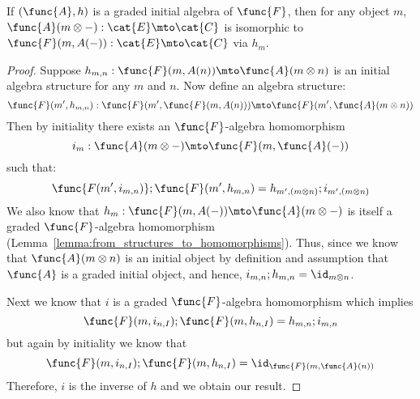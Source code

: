     \begin{lemma}
    \label{lemma:graded_lambeks_lemma}
    If $(\func{A},h)$ is a graded initial algebra of $\func{F}$, 
    then for any object $m$, 
    $\func{A}(m \otimes -) : \cat{E} \mto \cat{C}$ is isomorphic to 
    $\func{F}(m, A(-)) : \cat{E} \mto \cat{C}$ via $h_m$.
    \end{lemma}
    \begin{proof}
    Suppose $h_{m,n} : \func{F}(m,A(n)) \mto \func{A}(m \otimes n)$ is an initial
    algebra structure for any $m$ and $n$.  
    Now define an algebra structure:
    \[
    \func{F}(m',h_{m,n}) : \func{F}(m',\func{F}(m,A(n))) \mto \func{F}(m',\func{A}(m \otimes n))
    \]
    Then by initiality there exists an $\func{F}$-algebra homomorphism 
    $$i_{m} : \func{A}(m \otimes -) \mto \func{F}(m,\func{A}(-))$$ such that:
    $$\func{F(m',i_{m,n})} ; \func{F}(m',h_{m,n}) = h_{m',(m \otimes n)} ;
    i_{m',(m \otimes n)}$$
    We also know that $h_{m} : \func{F}(m,A(-)) \mto \func{A}(m \otimes -)$ is
    itself a graded $\func{F}$-algebra homomorphism
    (Lemma~\ref{lemma:from_structures_to_homomorphisms}). Thus, since we
    know that $\func{A}(m \otimes n)$ is an initial object by definition and
    assumption that $\func{A}$ is a graded initial object, and hence, 
    $i_{m,n}; h_{m,n} = \id_{m \otimes n}$.  
    
    Next we know that $i$ is a graded $\func{F}$-algebra homomorphism which
    implies $$\func{F}(m,i_{n,I});\func{F}(m,h_{n,I}) =
    h_{m,n};i_{m,n}$$ but again by initiality we know that
    $$\func{F}(m,i_{n,I});\func{F}(m,h_{n,I}) =
    \id_{\func{F}(m,\func{A}(n))}$$
    Therefore, $i$ is the inverse of $h$ and we obtain our result.
    \end{proof}
    
